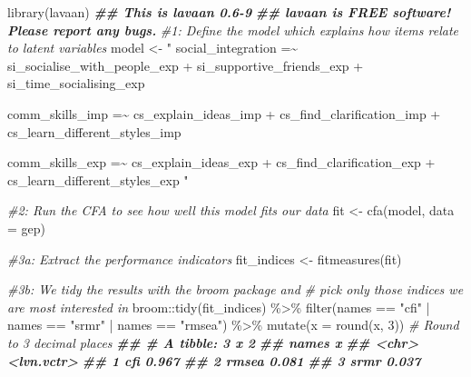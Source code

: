\documentclass[
]{book}
\newenvironment{Shaded}{\begin{snugshade}}{\end{snugshade}}
\newcommand{\AttributeTok}[1]{\textcolor[rgb]{0.77,0.63,0.00}{#1}}
\newcommand{\CommentTok}[1]{\textcolor[rgb]{0.56,0.35,0.01}{\textit{#1}}}
\newcommand{\DecValTok}[1]{\textcolor[rgb]{0.00,0.00,0.81}{#1}}
\newcommand{\DocumentationTok}[1]{\textcolor[rgb]{0.56,0.35,0.01}{\textbf{\textit{#1}}}}
\newcommand{\FunctionTok}[1]{\textcolor[rgb]{0.00,0.00,0.00}{#1}}
\newcommand{\NormalTok}[1]{#1}
\newcommand{\OtherTok}[1]{\textcolor[rgb]{0.56,0.35,0.01}{#1}}
\newcommand{\SpecialCharTok}[1]{\textcolor[rgb]{0.00,0.00,0.00}{#1}}
\newcommand{\StringTok}[1]{\textcolor[rgb]{0.31,0.60,0.02}{#1}}
\begin{document}
\begin{Shaded}
\begin{Highlighting}[]
\FunctionTok{library}\NormalTok{(lavaan)}
\DocumentationTok{\#\# This is lavaan 0.6{-}9}
\DocumentationTok{\#\# lavaan is FREE software! Please report any bugs.}
\CommentTok{\#1: Define the model which explains how items relate to latent variables}
\NormalTok{model }\OtherTok{\textless{}{-}} \StringTok{"}
\StringTok{social\_integration =\textasciitilde{}}
\StringTok{si\_socialise\_with\_people\_exp +}
\StringTok{si\_supportive\_friends\_exp +}
\StringTok{si\_time\_socialising\_exp}

\StringTok{comm\_skills\_imp =\textasciitilde{}}
\StringTok{cs\_explain\_ideas\_imp +}
\StringTok{cs\_find\_clarification\_imp +}
\StringTok{cs\_learn\_different\_styles\_imp}

\StringTok{comm\_skills\_exp =\textasciitilde{}}
\StringTok{cs\_explain\_ideas\_exp +}
\StringTok{cs\_find\_clarification\_exp +}
\StringTok{cs\_learn\_different\_styles\_exp}
\StringTok{"}

\CommentTok{\#2: Run the CFA to see how well this model fits our data}
\NormalTok{fit }\OtherTok{\textless{}{-}} \FunctionTok{cfa}\NormalTok{(model, }\AttributeTok{data =}\NormalTok{ gep)}

\CommentTok{\#3a: Extract the performance indicators}
\NormalTok{fit\_indices }\OtherTok{\textless{}{-}} \FunctionTok{fitmeasures}\NormalTok{(fit)}

\CommentTok{\#3b: We tidy the results with the \textquotesingle{}broom\textquotesingle{} package and}
\CommentTok{\#    pick only those indices we are most interested in}
\NormalTok{broom}\SpecialCharTok{::}\FunctionTok{tidy}\NormalTok{(fit\_indices) }\SpecialCharTok{\%\textgreater{}\%}
  \FunctionTok{filter}\NormalTok{(names }\SpecialCharTok{==} \StringTok{"cfi"} \SpecialCharTok{|}
\NormalTok{         names }\SpecialCharTok{==} \StringTok{"srmr"} \SpecialCharTok{|}
\NormalTok{         names }\SpecialCharTok{==} \StringTok{"rmsea"}\NormalTok{) }\SpecialCharTok{\%\textgreater{}\%}
  \FunctionTok{mutate}\NormalTok{(}\AttributeTok{x =} \FunctionTok{round}\NormalTok{(x, }\DecValTok{3}\NormalTok{))         }\CommentTok{\# Round to 3 decimal places}
\DocumentationTok{\#\# \# A tibble: 3 x 2}
\DocumentationTok{\#\#   names x         }
\DocumentationTok{\#\#   \textless{}chr\textgreater{} \textless{}lvn.vctr\textgreater{}}
\DocumentationTok{\#\# 1 cfi   0.967     }
\DocumentationTok{\#\# 2 rmsea 0.081     }
\DocumentationTok{\#\# 3 srmr  0.037}
\end{Highlighting}
\end{Shaded}
\end{document}
